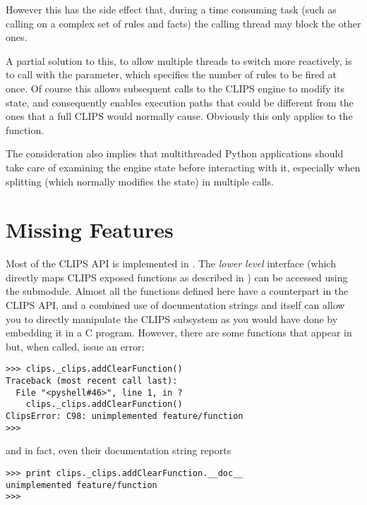 However this has the side effect that, during a time consuming task
(such as calling  on a complex set of rules and facts)
the calling thread may block the other ones.

A partial solution to this, to allow multiple threads to switch more
reactively, is to call  with the  parameter,
which specifies the number of rules to be fired at once. Of course this
allows subsequent calls to the CLIPS engine to modify its state, and
consequently enables execution paths that could be different from the
ones that a full CLIPS  would normally cause. Obviously
this only applies to the  function.

The consideration also implies that multithreaded Python applications
should take care of examining the engine state before interacting with
it, especially when splitting  (which normally modifies
the state) in multiple calls.



\chapter{Missing Features\label{pyclips-missing}}

Most of the CLIPS API is implemented in \pyclips{}. The \emph{lower
level} interface (which directly maps CLIPS exposed functions as
described in \clipsapg{}) can be accessed using the
 submodule. Almost all the functions defined here
have a counterpart in the CLIPS API, and a combined use of documentation
strings and \clipsapg{} itself can allow you to directly manipulate the
CLIPS subsystem as you would have done by embedding it in a C program.
However, there are some functions that appear in 
but, when called, issue an error:

\begin{verbatim}
>>> clips._clips.addClearFunction()
Traceback (most recent call last):
  File "<pyshell#46>", line 1, in ?
    clips._clips.addClearFunction()
ClipsError: C98: unimplemented feature/function
>>>
\end{verbatim}

and in fact, even their documentation string reports

\begin{verbatim}
>>> print clips._clips.addClearFunction.__doc__
unimplemented feature/function
>>>
\end{verbatim}


